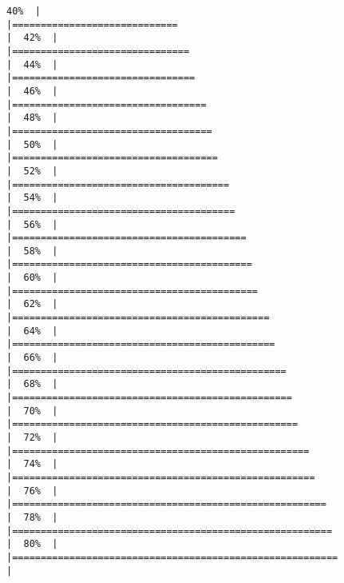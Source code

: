 \documentclass[
]{article}
\begin{document}
\begin{verbatim}
40%  |                                                                              |=============================                                         |  42%  |                                                                              |===============================                                       |  44%  |                                                                              |================================                                      |  46%  |                                                                              |==================================                                    |  48%  |                                                                              |===================================                                   |  50%  |                                                                              |====================================                                  |  52%  |                                                                              |======================================                                |  54%  |                                                                              |=======================================                               |  56%  |                                                                              |=========================================                             |  58%  |                                                                              |==========================================                            |  60%  |                                                                              |===========================================                           |  62%  |                                                                              |=============================================                         |  64%  |                                                                              |==============================================                        |  66%  |                                                                              |================================================                      |  68%  |                                                                              |=================================================                     |  70%  |                                                                              |==================================================                    |  72%  |                                                                              |====================================================                  |  74%  |                                                                              |=====================================================                 |  76%  |                                                                              |=======================================================               |  78%  |                                                                              |========================================================              |  80%  |                                                                              |=========================================================             |  
\end{verbatim}
\end{document}
